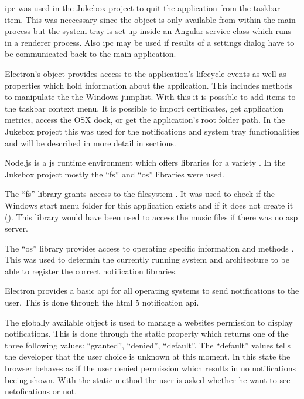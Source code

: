 \gls{ipc} was used in the Jukebox project to quit the application from the taskbar item. This was neccessary since the  object is only available from within the main process but the system tray is set up inside an Angular service class which runs in a renderer process. Also \gls{ipc} may be used if results of a \zB settings dialog have to be communicated back to the main application.


Electron's  object provides access to the application's lifecycle events as well as properties which hold information about the appilcation. This includes methods to manipulate the the Windows jumplist. With this it is possible to add items to the taskbar context menu. It is possible to import certificates, get application metrics, access the OSX dock, or get the application's root folder path. In the Jukebox project this was used for the notifications and system tray functionalities and will be described in more detail in  sections.


Node.js is a \gls{js} runtime environment which offers libraries for a variety . In the Jukebox project mostly the \enquote{fs} and \enquote{os} libraries were used.

The \enquote{fs} library grants access to the filesystem \cite{nodejsFS}. It was used to check if the Windows start menu folder for this application exists and if it does not create it (). This library would have been used to access the music files if there was no \gls{asp} server.

The \enquote{os} library provides access to operating specific information and methods \cite{nodejsOS}. This was used to determin the currently running system and architecture to be able to register the correct notification libraries.







Electron provides a basic \gls{api} for all operating systems to send notifications to the user. This is done through the \gls{html} 5 notification \gls{api}.


The globally available  object is used to manage a websites permission to display notifications. This is done through the static  property which returns one of the three following values: \enquote{granted}, \enquote{denied}, \enquote{default}. The \enquote{default} values tells the developer that the user choice is unknown at this moment. In this state the browser behaves as if the user denied permission which results in no notifications beeing shown. With the static  method the user is asked whether he want to see netofications or not.

